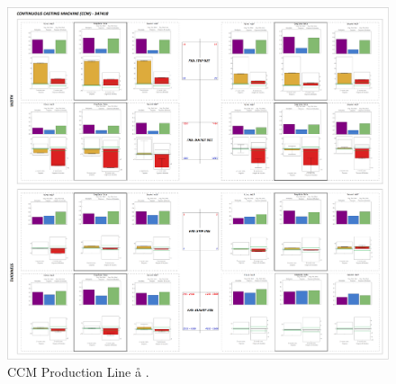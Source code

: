 \begin{landscape}
\begin{figure}[ht]
	\centering
	\vspace*{-1.5cm}
	\captionsetup{width=1.1\linewidth}
	\includegraphics[width=1.2\textwidth]{../images/supplements-CCM_real_life_events_analysis-results.png}
	\caption{CCM Production Line \aa{} \bb{}.}
	\label{figure-supplements-CCM}
\end{figure}
\end{landscape}